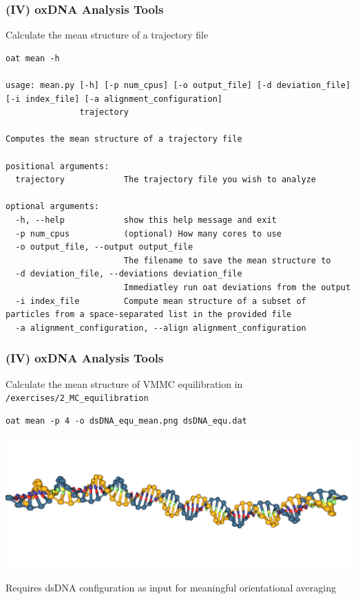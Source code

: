 \documentclass[slidestop,compress,9pt]{beamer}
\begin{document}
\begin{frame}[fragile]
\frametitle{(IV) oxDNA Analysis Tools}

Calculate the mean structure of a trajectory file
\begin{lstlisting}
oat mean -h

usage: mean.py [-h] [-p num_cpus] [-o output_file] [-d deviation_file] [-i index_file] [-a alignment_configuration]
               trajectory

Computes the mean structure of a trajectory file

positional arguments:
  trajectory            The trajectory file you wish to analyze

optional arguments:
  -h, --help            show this help message and exit
  -p num_cpus           (optional) How many cores to use
  -o output_file, --output output_file
                        The filename to save the mean structure to
  -d deviation_file, --deviations deviation_file
                        Immediatley run oat deviations from the output
  -i index_file         Compute mean structure of a subset of particles from a space-separated list in the provided file
  -a alignment_configuration, --align alignment_configuration
\end{lstlisting}

\end{frame}
\begin{frame}[fragile]
\frametitle{(IV) oxDNA Analysis Tools}

Calculate the mean structure of VMMC equilibration in \texttt{/exercises/2\_MC\_equilibration}

\begin{lstlisting}
oat mean -p 4 -o dsDNA_equ_mean.png dsDNA_equ.dat 
\end{lstlisting}
\includegraphics[width=\textwidth]{oxView_dsDNA_mean_config.png}

Requires dsDNA configuration as input for meaningful orientational averaging 

\end{frame}
\end{document}
